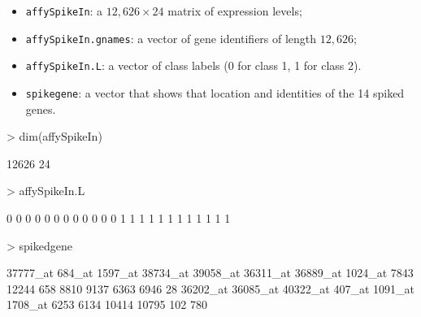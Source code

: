 \documentclass[11pt]{article}
\newcommand{\code}[1]{{\tt #1}}
\begin{document}
\begin{itemize}
\item
{\code{affySpikeIn}:} a $12,626 \times 24 $ matrix of expression levels;
\item
{\code{affySpikeIn.gnames}:} a vector of gene identifiers of length $12,626$;
\item
{\code{affySpikeIn.L}:} a vector of class labels (0 for class 1, 1 for class 2). 
\item
{\code{spikegene}:} a vector that shows that location and identities of the 14 spiked genes. 
\end{itemize}

\begin{Schunk}
\begin{Sinput}
> dim(affySpikeIn)
\end{Sinput}
\begin{Soutput}
[1] 12626    24
\end{Soutput}
\begin{Sinput}
> affySpikeIn.L
\end{Sinput}
\begin{Soutput}
 [1] 0 0 0 0 0 0 0 0 0 0 0 0 1 1 1 1 1 1 1 1 1 1 1 1
\end{Soutput}
\begin{Sinput}
> spikedgene
\end{Sinput}
\begin{Soutput}
37777_at   684_at  1597_at 38734_at 39058_at 36311_at 36889_at  1024_at 
    7843    12244      658     8810     9137     6363     6946       28 
36202_at 36085_at 40322_at   407_at  1091_at  1708_at 
    6253     6134    10414    10795      102      780 
\end{Soutput}
\end{Schunk}
\end{document}

